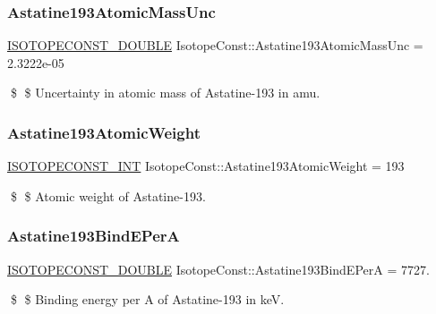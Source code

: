\subsubsection{\texorpdfstring{Astatine193\+Atomic\+Mass\+Unc}{Astatine193AtomicMassUnc}}
{\footnotesize\ttfamily \mbox{\hyperlink{group___isotope_const-_macros_ga8f45a7272ce02c0b4c65c44636ed719a}{I\+S\+O\+T\+O\+P\+E\+C\+O\+N\+S\+T\+\_\+\+D\+O\+U\+B\+LE}} Isotope\+Const\+::\+Astatine193\+Atomic\+Mass\+Unc = 2.\+3222e-\/05}

\$ \$ Uncertainty in atomic mass of Astatine-\/193 in amu. \mbox{\label{group___isotope_const-_astatine-_at193_gaa306c7fb0b0069b64e61b3b573fa7235}} 
\subsubsection{\texorpdfstring{Astatine193\+Atomic\+Weight}{Astatine193AtomicWeight}}
{\footnotesize\ttfamily \mbox{\hyperlink{group___isotope_const-_macros_ga5f18360b3e99483a35c32d789e62621c}{I\+S\+O\+T\+O\+P\+E\+C\+O\+N\+S\+T\+\_\+\+I\+NT}} Isotope\+Const\+::\+Astatine193\+Atomic\+Weight = 193}

\$ \$ Atomic weight of Astatine-\/193. \mbox{\label{group___isotope_const-_astatine-_at193_ga66c2742eac6db5c47b2747ed48136e5d}} 
\subsubsection{\texorpdfstring{Astatine193\+Bind\+E\+PerA}{Astatine193BindEPerA}}
{\footnotesize\ttfamily \mbox{\hyperlink{group___isotope_const-_macros_ga8f45a7272ce02c0b4c65c44636ed719a}{I\+S\+O\+T\+O\+P\+E\+C\+O\+N\+S\+T\+\_\+\+D\+O\+U\+B\+LE}} Isotope\+Const\+::\+Astatine193\+Bind\+E\+PerA = 7727.}

\$ \$ Binding energy per A of Astatine-\/193 in keV. \mbox{\label{group___isotope_const-_astatine-_at193_ga80a1a250c0254ae41fd542c5ca88ce74}} 
